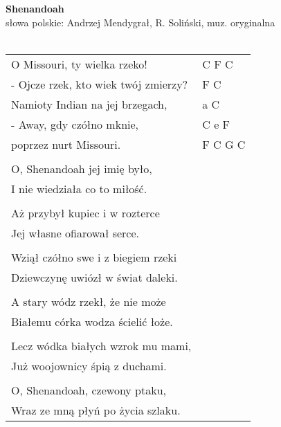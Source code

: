 \documentclass[a5paper]{article}
\begin{document}


\noindent
\fontsize{12pt}{15pt}\selectfont
\textbf{Shenandoah} \\
\fontsize{8pt}{10pt}\selectfont
słowa polskie: Andrzej Mendygrał, R. Soliński, muz. oryginalna \\ \\
\fontsize{10pt}{12pt}\selectfont
{}
\begin{tabular}{@{}p{7.50cm}p{3cm}@{}}
\noindent
O Missouri, ty wielka rzeko! & C F C \\
- Ojcze rzek, kto wiek twój zmierzy? & F C \\
Namioty Indian na jej brzegach, & a C \\
- Away, gdy czółno mknie, & C e F \\
\hspace{1cm} poprzez nurt Missouri. & F C G C \\ \\
 
O, Shenandoah jej imię było, \\
I nie wiedziała co to miłość. \\\\
 
Aż przybył kupiec i w rozterce\\
Jej własne ofiarował serce.\\\\
 
Wziął czółno swe i z biegiem rzeki\\
Dziewczynę uwiózł w świat daleki.\\\\
 
A stary wódz rzekł, że nie może\\
Białemu córka wodza ścielić łoże.\\\\
 
Lecz wódka białych wzrok mu mami,\\
Już woojownicy śpią z duchami.\\\\
 
O, Shenandoah, czewony ptaku,\\
Wraz ze mną płyń po życia szlaku.
\end{tabular}
\end{document}

